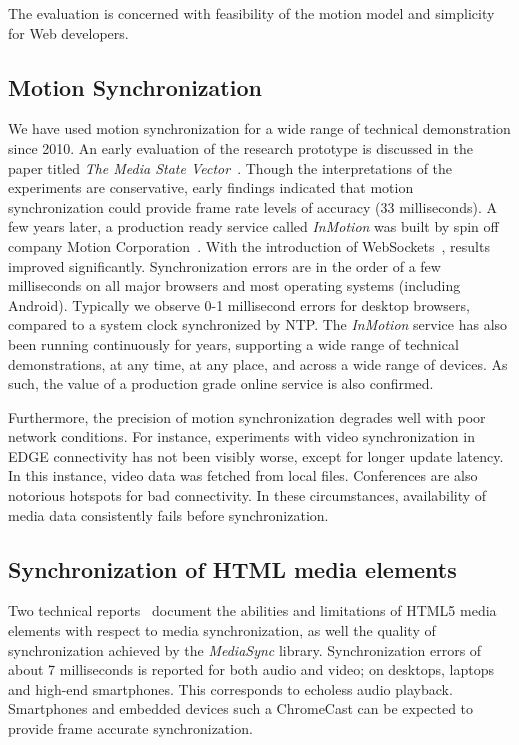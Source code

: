 The evaluation is concerned with feasibility of the motion model and
simplicity for Web developers.


\subsection {Motion Synchronization}

We have used motion synchronization for a wide range of technical
demonstration since 2010. An early evaluation of the research prototype is
discussed in the paper titled \emph{The Media State Vector}~\cite{msv}. Though
the interpretations of the experiments are conservative, early findings
indicated that motion synchronization could provide frame rate levels of
accuracy (33 milliseconds). A few years later, a production ready service
called \emph{InMotion} was built by spin off company Motion
Corporation~\cite{mcorp}. With the introduction of
WebSockets~\cite{websocket}, results improved significantly. Synchronization
errors are in the order of a few milliseconds on all major browsers and most
operating systems (including Android). Typically we observe 0-1 millisecond
errors for desktop browsers, compared to a system clock synchronized by NTP.
The \emph{InMotion} service has also been running continuously for years,
supporting a wide range of technical demonstrations, at any time, at any
place, and across a wide range of devices. As such, the value of a production
grade online service is also confirmed.

Furthermore, the precision of motion synchronization degrades well with poor
network conditions. For instance, experiments with video synchronization in
EDGE connectivity has not been visibly worse, except for longer update
latency. In this instance, video data was fetched from local files.
Conferences are also notorious hotspots for bad connectivity. In these
circumstances, availability of media data consistently fails before
synchronization.


\subsection {Synchronization of HTML media elements}

Two technical reports~\cite{syncreport1,syncreport2} document the abilities
and limitations of HTML5 media elements with respect to media synchronization,
as well the quality of synchronization achieved by the \emph{MediaSync}
library. Synchronization errors of about 7 milliseconds is reported for both
audio and video; on desktops, laptops and high-end smartphones. This
corresponds to echoless audio playback. Smartphones and embedded devices such
a ChromeCast can be expected to provide frame accurate synchronization. 

